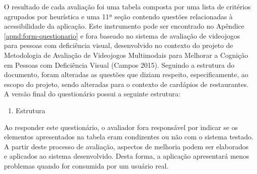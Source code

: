 O resultado de cada avaliação foi uma tabela composta por uma lista de critérios agrupados por heurística e uma 11ª seção contendo questões relacionadas à acessibilidade da aplicação. Este instrumento pode ser encontrado no Apêndice \ref{apnd:form-questionario} e fora baseado no sistema de avaliação de videojogos para pessoas com deficiência visual, desenvolvido no contexto do projeto de Metodologia de Avaliação de Videojogos Multimodais para Melhorar a Cognição em Pessoas com Deficiência Visual (Campos 2015)\nocite{CAMPOS2015}. Seguindo a estrutura do documento, foram alteradas as questões que diziam respeito, especificamente, ao escopo do projeto, sendo alteradas para o contexto de cardápios de restaurantes. A versão final do questionário possui a seguinte estrutura:
\begin{enumerate}
	\item Estrutura
\end{enumerate}

Ao responder este questionário, o avaliador fora responsável por indicar se os elementos apresentados na tabela eram condizentes ou não com o sistema testado. A partir deste processo de avaliação, aspectos de melhoria podem ser elaborados e aplicados ao sistema desenvolvido. Desta forma, a aplicação apresentará menos problemas quando for consumida por um usuário real.

